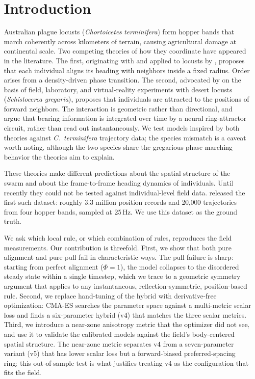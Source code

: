 \documentclass[11pt]{article}
\begin{document}
\section{Introduction}

Australian plague locusts (\textit{Chortoicetes terminifera}) form
hopper bands that march coherently across kilometers of terrain, causing
agricultural damage at continental scale. Two competing theories of how
they coordinate have appeared in the literature. The first, originating
with \citet{vicsek1995} and applied to locusts by \citet{buhl2006},
proposes that each individual aligns its heading with neighbors inside a
fixed radius. Order arises from a density-driven phase transition. The
second, advocated by \citet{sayin2025} on the basis of field, laboratory,
and virtual-reality experiments with desert locusts (\textit{Schistocerca
gregaria}), proposes that individuals are attracted to the positions of
forward neighbors. The interaction is geometric rather than directional,
and \citet{sayin2025} argue that bearing information is integrated over
time by a neural ring-attractor circuit, rather than read out
instantaneously. We test models inspired by both theories against
\textit{C.~terminifera} trajectory data; the species mismatch is a caveat
worth noting, although the two species share the gregarious-phase
marching behavior the theories aim to explain.

These theories make different predictions about the spatial structure of
the swarm and about the frame-to-frame heading dynamics of individuals.
Until recently they could not be tested against individual-level field
data. \citet{weinburd2024} released the first such dataset: roughly 3.3
million position records and 20{,}000 trajectories from four hopper bands,
sampled at 25\,Hz. We use this dataset as the ground truth.

We ask which local rule, or which combination of rules, reproduces the
field measurements. Our contribution is threefold. First, we show that
both pure alignment and pure pull fail in characteristic ways. The pull
failure is sharp: starting from perfect alignment ($\Phi = 1$), the model
collapses to the disordered steady state within a single timestep, which
we trace to a geometric symmetry argument that applies to any
instantaneous, reflection-symmetric, position-based rule. Second, we
replace hand-tuning of the hybrid with derivative-free optimization:
CMA-ES searches the parameter space against a multi-metric scalar loss
and finds a six-parameter hybrid (v4) that matches the three scalar
metrics. Third, we introduce a near-zone anisotropy metric that the
optimizer did not see, and use it to validate the calibrated models
against the field's body-centered spatial structure. The near-zone
metric separates v4 from a seven-parameter variant (v5) that has lower
scalar loss but a forward-biased preferred-spacing ring; this
out-of-sample test is what justifies treating v4 as the configuration
that fits the field.
\end{document}
